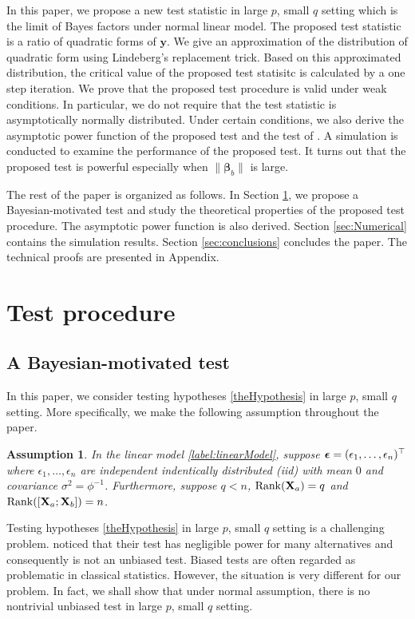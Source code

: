 \documentclass[11pt]{article}
\DeclareMathOperator{\myRank}{Rank}
\newcommand{\By}{\mathbf{y}}    \newcommand{\Bz}{\mathbf{z}}
\newcommand{\bfsym}[1]{\ensuremath{\boldsymbol{#1}}}
\def\bbeta{\bfsym \beta}
\theoremstyle{plain}
\newtheorem{assumption}{\quad\quad Assumption}
\theoremstyle{definition}
\theoremstyle{remark}
\begin{document}
In this paper, we propose a new test statistic in large $p$, small $q$ setting which is the limit of Bayes factors under normal linear model.
The proposed test statistic is a ratio of quadratic forms of $\By$.
We give an approximation of the distribution of quadratic form using Lindeberg's replacement trick.
Based on this approximated distribution, the critical value of the proposed test statisitc is calculated by a one step iteration.
We prove that the proposed test procedure is valid under weak conditions.
In particular, we do not require that the test statistic is asymptotically normally distributed.
Under certain conditions, we also derive the asymptotic power function of the proposed test and the test of \cite{Goeman2006}.
A simulation is conducted to examine the performance of the proposed test.
It turns out that the proposed test is powerful especially when $\|\bbeta_b\|$ is large.

The rest of the paper is organized as follows.
In Section \ref{sec:methodology}, we propose a Bayesian-motivated test and study the theoretical properties of the proposed test procedure.
The asymptotic power function is also derived.
Section \ref{sec:Numerical} contains the simulation results. 
Section \ref{sec:conclusions} concludes the paper.
The technical proofs are presented in Appendix.




\section{Test procedure}\label{sec:methodology}
\subsection{A Bayesian-motivated test}
In this paper, we consider testing hypotheses \eqref{theHypothesis} in large $p$, small $q$ setting.
More specifically, we make the following assumption throughout the paper.
\begin{assumption}
    In the linear model \eqref{label:linearModel}, 
    suppose $\bepsilon=(\epsilon_1,\ldots,\epsilon_n)^\top$ where $\epsilon_1,\ldots, \epsilon_n$ are independent indentically distributed (iid) with mean $0$ and covariance $\sigma^2=\phi^{-1}$.
    Furthermore, suppose $q<n$, $\myRank(\BX_a)=q$ and $\myRank([\BX_a; \BX_b])=n$.
    \label{Assumption}
\end{assumption}
Testing hypotheses \eqref{theHypothesis} in large $p$, small $q$ setting is a challenging problem.
\cite{Goeman2006} noticed that their test has negligible power for many alternatives and consequently is not an unbiased test.
Biased tests are often regarded as problematic in classical statistics.
However, the situation is very different for our problem.
In fact, we shall show that under normal assumption, there is no nontrivial unbiased test in large $p$, small $q$ setting.
\end{document}
